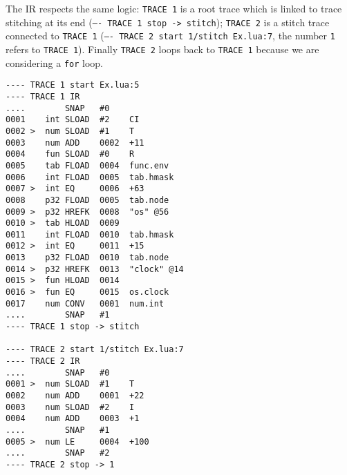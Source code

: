 The IR respects the same logic: \texttt{TRACE 1} is a root trace which is linked to trace stitching at its end (\texttt{---- TRACE 1 stop -> stitch});  \texttt{TRACE 2} is a stitch trace connected to \texttt{TRACE 1} (\texttt{---- TRACE 2 start 1/stitch Ex.lua:7}, the number \texttt{1} refers to \texttt{TRACE 1}). Finally \texttt{TRACE 2} loops back to \texttt{TRACE 1} because we are considering a \texttt{for} loop.


\begin{multicols}{2}
\begin{lstlisting}[style=DumpStyle]
---- TRACE 1 start Ex.lua:5
---- TRACE 1 IR
....        SNAP   #0
0001    int SLOAD  #2    CI
0002 >  num SLOAD  #1    T
0003    num ADD    0002  +11 
0004    fun SLOAD  #0    R
0005    tab FLOAD  0004  func.env
0006    int FLOAD  0005  tab.hmask
0007 >  int EQ     0006  +63 
0008    p32 FLOAD  0005  tab.node
0009 >  p32 HREFK  0008  "os" @56
0010 >  tab HLOAD  0009
0011    int FLOAD  0010  tab.hmask
0012 >  int EQ     0011  +15 
0013    p32 FLOAD  0010  tab.node
0014 >  p32 HREFK  0013  "clock" @14
0015 >  fun HLOAD  0014
0016 >  fun EQ     0015  os.clock
0017    num CONV   0001  num.int
....        SNAP   #1
---- TRACE 1 stop -> stitch

---- TRACE 2 start 1/stitch Ex.lua:7
---- TRACE 2 IR
....        SNAP   #0
0001 >  num SLOAD  #1    T
0002    num ADD    0001  +22 
0003    num SLOAD  #2    I
0004    num ADD    0003  +1  
....        SNAP   #1
0005 >  num LE     0004  +100
....        SNAP   #2 
---- TRACE 2 stop -> 1
\end{lstlisting}
\end{multicols}
